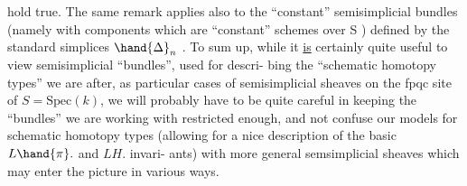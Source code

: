 hold true. The same remark applies also to the ``constant'' semisimplicial
bundles (namely with  components which are ``constant'' schemes
over S ) defined by the standard simplices $\hand{\Delta}_n$ . To sum up, while it \uline{is}
certainly quite useful to view semisimplicial ``bundles'', used for descri-%
bing the ``schematic homotopy types'' we are after, as particular cases
of  semisimplicial sheaves on the fpqc site of $S=\mathrm{Spec}(k)$, we will probably
have to be quite careful in keeping the ``bundles'' we are working with
restricted enough, and not confuse our models for schematic homotopy
types (allowing for a nice description of the basic $L\hand{\pi}.$ and $LH.$ invari-%
ants) with more general semsimplicial sheaves which may enter the picture
in various ways.


